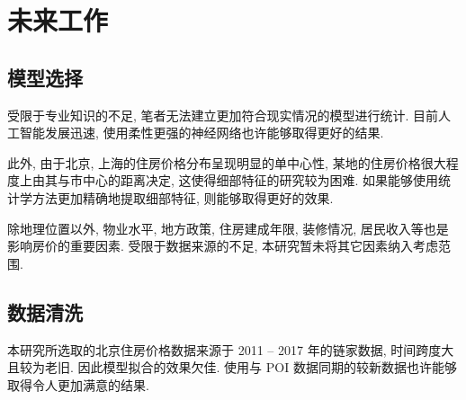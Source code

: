 \section{未来工作}
\subsection{模型选择}
受限于专业知识的不足, 笔者无法建立更加符合现实情况的模型进行统计.
目前人工智能发展迅速, 使用柔性更强的神经网络也许能够取得更好的结果.

此外, 由于北京, 上海的住房价格分布呈现明显的单中心性, 某地的住房价格很大程度上由其与市中心的距离决定, 这使得细部特征的研究较为困难.
如果能够使用统计学方法更加精确地提取细部特征, 则能够取得更好的效果.

除地理位置以外, 物业水平, 地方政策, 住房建成年限, 装修情况, 居民收入等也是影响房价的重要因素.
受限于数据来源的不足, 本研究暂未将其它因素纳入考虑范围.

\subsection{数据清洗}
本研究所选取的北京住房价格数据来源于 2011 -- 2017 年的链家数据, 时间跨度大且较为老旧.
因此模型拟合的效果欠佳.
使用与 POI 数据同期的较新数据也许能够取得令人更加满意的结果.
